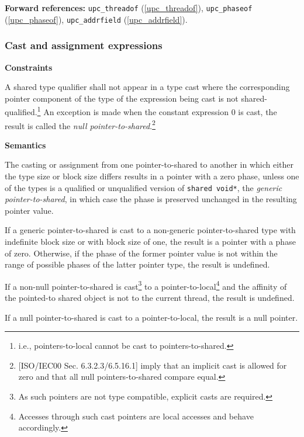 \documentclass[12pt,titlepage]{article}
\newcounter{parnum}
\newcommand\np{\addtocounter{parnum}{1}\hspace{-2em}\makebox[2em][l]{\arabic{parnum}}}
\begin{document}
{\bf Forward references:}  {\tt upc\_threadof} (\ref{upc_threadof}),
          {\tt upc\_phaseof} (\ref{upc_phaseof}), {\tt upc\_addrfield} (\ref{upc_addrfield}). 

\subsubsection{Cast and assignment expressions}

{\bf Constraints} 

\np A shared type qualifier shall not appear in a type cast
    where the corresponding pointer component of the type of the expression
    being cast is not shared-qualified.\footnote{i.e., pointers-to-local
    cannot be cast to pointers-to-shared.}  An exception is made when the constant
    expression 0 is cast, the result is called the {\em null 
    pointer-to-shared}.\footnote{[ISO/IEC00 Sec.
    6.3.2.3/6.5.16.1] imply that an implicit cast is allowed for zero
    and that all null pointers-to-shared compare equal.}

{\bf Semantics} 

\np The casting or assignment from one pointer-to-shared 
    to another in which either the type size or block size differs results  in 
    a pointer with a zero phase, unless one of the types is a qualified or
    unqualified version of {\tt shared void*}, the {\em generic pointer-to-shared},
    in which case the phase is preserved unchanged in the resulting
    pointer value.
    
\np If a generic pointer-to-shared is cast to a non-generic 
     pointer-to-shared type with indefinite block size or with block size of 
     one, the result is a pointer with a phase of zero.  Otherwise, if the
     phase of the former pointer value is not within the range of possible
     phases of the latter pointer type, the result is undefined.
  
\np If a non-null pointer-to-shared is cast\footnote{As such pointers
     are not type compatible, explicit casts are required.} to a
     pointer-to-local\footnote{Accesses through such cast pointers are
     local accesses and behave accordingly.} and the affinity
     of the pointed-to shared object is not to the current thread, the result is
     undefined.
     
\np If a null pointer-to-shared is cast to a pointer-to-local,
     the result is a null pointer.    
       
\end{document}
